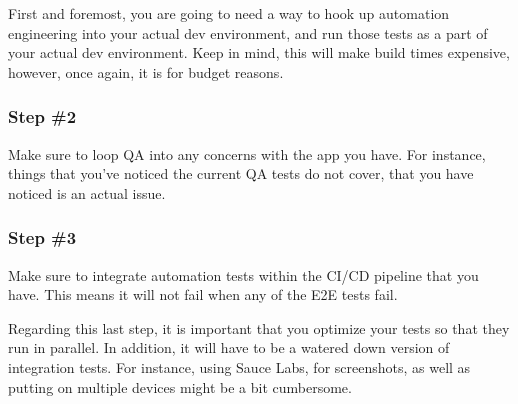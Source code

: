 First and foremost, you are going to need a way to hook up automation engineering
into your actual dev environment, and run those tests as a part of your actual
dev environment. Keep in mind, this will make build times expensive, however,
once again, it is for budget reasons.

\subsubsection{Step \#2}
Make sure to loop QA into any concerns with the app you have. For instance,
things that you've noticed the current QA tests do not cover, that you have
noticed is an actual issue.

\subsubsection{Step \#3}
Make sure to integrate automation tests within the CI/CD pipeline that you have.
This means it will not fail when any of the E2E tests fail.

Regarding this last step, it is important that you optimize your tests so
that they run in parallel. In addition, it will have to be a watered down
version of integration tests. For instance, using Sauce Labs, for screenshots,
as well as putting on multiple devices might be a bit cumbersome.
